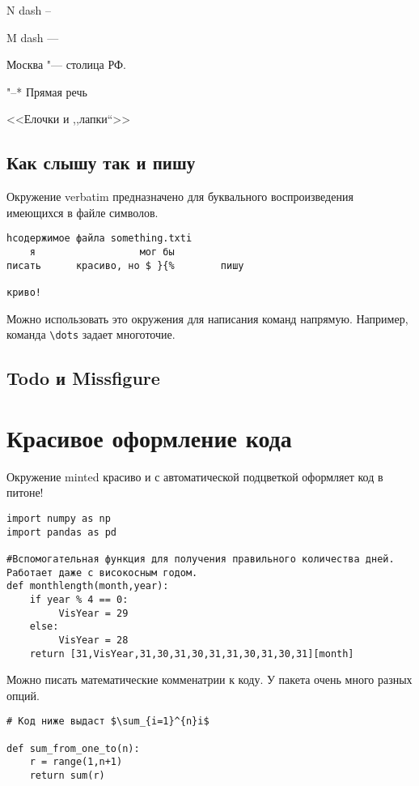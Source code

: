 \documentclass[12pt, a4paper]{article}
\begin{document}
N dash --

M dash ---

Москва "--- столица РФ.

"--* Прямая речь

<<Елочки и ,,лапки``>>



\subsection{Как слышу так и пишу}

Окружение verbatim предназначено для буквального воспроизведения имеющихся в файле символов.

\begin{verbatim}
hсодержимое файла something.txti
	я                  мог бы
писать      красиво, но $ }{%        пишу

криво!
\end{verbatim}

Можно использовать это окружения для написания команд напрямую. Например, команда \verb|\dots| задает многоточие.


\subsection{Todo и Missfigure}


\vspace{2mm}



\section{Красивое оформление кода}

Окружение minted красиво и с автоматической подцветкой оформляет код в питоне!

\begin{verbatim}
import numpy as np
import pandas as pd

#Вспомогательная функция для получения правильного количества дней. Работает даже с високосным годом.
def monthlength(month,year):
    if year % 4 == 0:
         VisYear = 29
    else:
         VisYear = 28
    return [31,VisYear,31,30,31,30,31,31,30,31,30,31][month]
\end{verbatim}

Можно писать математические комменатрии к коду. У пакета очень много разных опций.

\begin{verbatim}
# Код ниже выдаст $\sum_{i=1}^{n}i$

def sum_from_one_to(n):
    r = range(1,n+1)
    return sum(r)
\end{verbatim}
\end{document}
